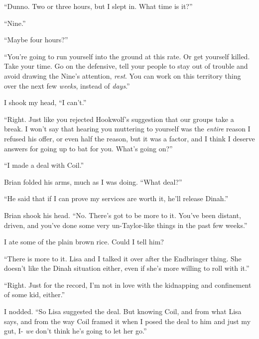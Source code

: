 ``Dunno.  Two or three hours, but I slept in.  What time is it?''



``Nine.''



``Maybe four hours?''



``You're going to run yourself into the ground at this rate.  Or get yourself killed.  Take your time.  Go on the defensive, tell your people to stay out of trouble and avoid drawing the Nine's attention, \emph{rest}.  You can work on this territory thing over the next few \emph{weeks}, instead of \emph{days}.''



I shook my head, ``I can't.''



``Right.  Just like you rejected Hookwolf's suggestion that our groups take a break.  I won't say that hearing you muttering to yourself was the \emph{entire} reason I refused his offer, or even half the reason, but it was a factor, and I think I deserve answers for going up to bat for you.  What's going on?''



``I made a deal with Coil.''



Brian folded his arms, much as I was doing.  ``What deal?''



``He said that if I can prove my services are worth it, he'll release Dinah.''



Brian shook his head.  ``No.  There's got to be more to it.  You've been distant, driven, and you've done some very un-Taylor-like things in the past few weeks.''



I ate some of the plain brown rice.  Could I tell him?



``There is more to it.  Lisa and I talked it over after the Endbringer thing.  She doesn't like the Dinah situation either, even if she's more willing to roll with it.''



``Right.  Just for the record, I'm not in love with the kidnapping and confinement of some kid, either.''



I nodded.  ``So Lisa suggested the deal.  But knowing Coil, and from what Lisa says, and from the way Coil framed it when I posed the deal to him and just my gut, I- \emph{we} don't think he's going to let her go.''



